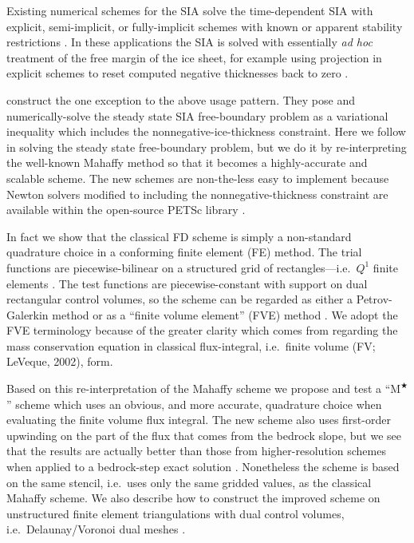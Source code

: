\documentclass[twocolumn,letterpaper]{igs}
\newcommand{\Mstar}{$\text{M}^{\bigstar}$\xspace}
\begin{document}
Existing numerical schemes for the SIA solve the time-dependent SIA with explicit, semi-implicit, or fully-implicit schemes with known or apparent stability restrictions \citep[among others]{Bueleretal2005,EgholmNielsen2010,HindmarshPayne1996,Huybrechtsetal1996,
JaroschSchoofAnslow2013}.  In these applications the SIA is solved with essentially \emph{ad hoc} treatment of the free margin of the ice sheet, for example using projection in explicit schemes to reset computed negative thicknesses back to zero \citep{Bueleretal2005,JaroschSchoofAnslow2013}.

\cite{JouvetBueler2012} construct the one exception to the above usage pattern.  They pose and numerically-solve the steady state SIA free-boundary problem as a variational inequality \citep{KinderlehrerStampacchia1980} which includes the nonnegative-ice-thickness constraint.  Here we follow \cite{JouvetBueler2012} in solving the steady state free-boundary problem, but we do it by re-interpreting the well-known Mahaffy method so that it becomes a highly-accurate and scalable scheme.  The new schemes are non-the-less easy to implement because Newton solvers modified to including the nonnegative-thickness constraint \citep{BensonMunson2006} are available within the open-source PETSc library \citep{Balayetal2014}.

In fact we show that the classical \cite{Mahaffy1976} FD scheme is simply a non-standard quadrature choice in a conforming finite element (FE) method.  The trial functions are piecewise-bilinear on a structured grid of rectangles---i.e.~$Q^1$ finite elements \citep{Elmanetal2005}.  The test functions are piecewise-constant with support on dual rectangular control volumes, so the scheme can be regarded as either a Petrov-Galerkin method \citep{Elmanetal2005} or as a ``finite volume element'' (FVE) method \citep{Cai1990,EwingLinLin2002}.  We adopt the FVE terminology because of the greater clarity which comes from regarding the mass conservation equation in classical flux-integral, i.e.~finite volume (FV; LeVeque, 2002),\nocite{LeVeque2002} form.

Based on this re-interpretation of the Mahaffy scheme we propose and test a ``\Mstar'' scheme which uses an obvious, and more accurate, quadrature choice when evaluating the finite volume flux integral.  The new scheme also uses first-order upwinding on the part of the flux that comes from the bedrock slope, but we see that the results are actually better than those from higher-resolution schemes when applied to a bedrock-step exact solution \citep{JaroschSchoofAnslow2013}.  Nonetheless the scheme is based on the same stencil, i.e.~uses only the same gridded values, as the classical Mahaffy scheme.  We also describe how to construct the improved scheme on unstructured finite element triangulations with dual control volumes, i.e.~Delaunay/Voronoi dual meshes \citep{EgholmNielsen2010,Ringleretal2013}.
\end{document}
